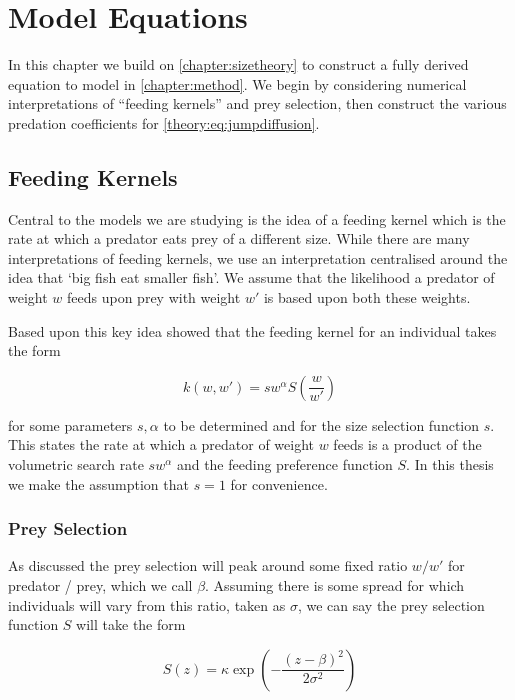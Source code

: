 \documentclass[../main]{subfiles}
\begin{document}
  \chapter{Model Equations}\label{chapter:modelequations}

  In this chapter we build on \autoref{chapter:sizetheory} to construct a fully derived equation to model in \autoref{chapter:method}. We begin by considering numerical interpretations of ``feeding kernels'' and prey selection, then construct the various predation coefficients for \autoref{theory:eq:jumpdiffusion}.

  \section{Feeding Kernels}
  Central to the models we are studying is the idea of a feeding kernel which is the rate at which a predator eats prey of a different size. While there are many interpretations of feeding kernels, we use an interpretation centralised around the idea that `big fish eat smaller fish'. We assume that the likelihood a predator of weight $w$ feeds upon prey with weight $w'$ is based upon both these weights.

  Based upon this key idea \cite{benoit2004} showed that the feeding kernel for an individual takes the form

  \begin{equation}\label{model:eq:kernel}
    k(w, w') = s w^{\alpha} S\left( \frac{w}{w'} \right)
  \end{equation}

  for some parameters $s, \alpha$ to be determined and for the size selection function $s$. This states the rate at which a predator of weight $w$ feeds is a product of the volumetric search rate $s w^{\alpha}$ and the feeding preference function $S$. In this thesis we make the assumption that $s = 1$ for convenience.

  \subsection{Prey Selection}
  As discussed the prey selection will peak around some fixed ratio $w / w'$ for predator / prey, which we call $\beta$. Assuming there is some spread for which individuals will vary from this ratio, taken as $\sigma$, we can say the prey selection function $S$ will take the form

  \begin{equation}
    S(z) = \kappa \exp{\left( - \frac{(z - \beta)^2}{2 \sigma^2} \right)}
  \end{equation}
\end{document}
